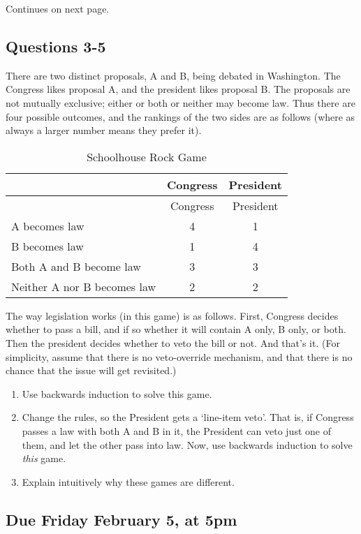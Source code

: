 \documentclass[
  11pt,
]{article}
\providecommand{\tightlist}{%
  \setlength{\itemsep}{0pt}\setlength{\parskip}{0pt}}
\begin{document}
Continues on next page.

\newpage

\hypertarget{questions-3-5}{%
\subsection{Questions 3-5}\label{questions-3-5}}

There are two distinct proposals, A and B, being debated in Washington.
The Congress likes proposal A, and the president likes proposal B. The
proposals are not mutually exclusive; either or both or neither may
become law. Thus there are four possible outcomes, and the rankings of
the two sides are as follows (where as always a larger number means they
prefer it).

\begin{longtable}[]{@{}lcc@{}}
\caption{Schoolhouse Rock Game}\tabularnewline
\toprule
& Congress & President\tabularnewline
\midrule
\endfirsthead
\toprule
& Congress & President\tabularnewline
\midrule
\endhead
A becomes law & 4 & 1\tabularnewline
B becomes law & 1 & 4\tabularnewline
Both A and B become law & 3 & 3\tabularnewline
Neither A nor B becomes law & 2 & 2\tabularnewline
\bottomrule
\end{longtable}

The way legislation works (in this game) is as follows. First, Congress
decides whether to pass a bill, and if so whether it will contain A
only, B only, or both. Then the president decides whether to veto the
bill or not. And that's it. (For simplicity, assume that there is no
veto-override mechanism, and that there is no chance that the issue will
get revisited.)

\begin{enumerate}
\def\labelenumi{\arabic{enumi}.}
\setcounter{enumi}{2}
\tightlist
\item
  Use backwards induction to solve this game.
\item
  Change the rules, so the President gets a `line-item veto'. That is,
  if Congress passes a law with both A and B in it, the President can
  veto just one of them, and let the other pass into law. Now, use
  backwards induction to solve \emph{this} game.
\item
  Explain intuitively why these games are different.
\end{enumerate}

\hypertarget{due-friday-february-5-at-5pm}{%
\subsection{Due Friday February 5, at
5pm}\label{due-friday-february-5-at-5pm}}
\end{document}
